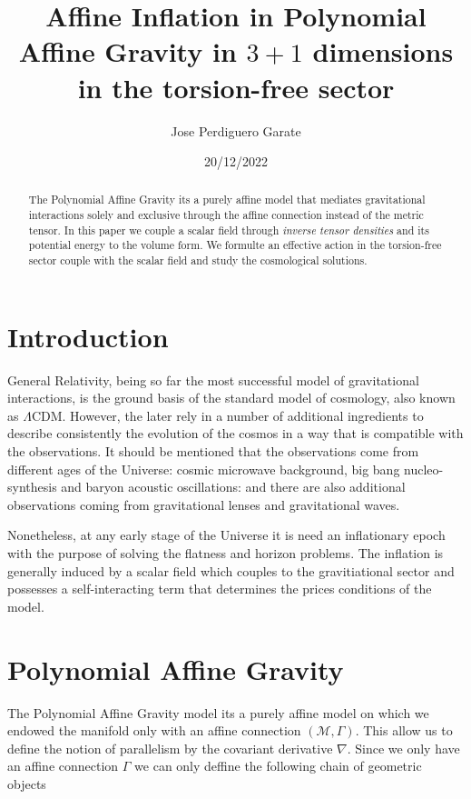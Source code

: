 \documentclass[10pt,a4paper]{article}
\title{Affine Inflation in Polynomial Affine Gravity in $3+1$ dimensions in the torsion-free sector}
\author{Jose Perdiguero Garate}
\date{20/12/2022}
\begin{document}
\maketitle

\begin{abstract}
  The Polynomial Affine Gravity its a purely affine model that mediates gravitational interactions solely and exclusive through the
  affine connection instead of the metric tensor. In this paper we couple a scalar field through \textit{inverse tensor densities} and 
  its potential energy to the volume form. We formulte an effective action in the torsion-free sector couple with the scalar field and
  study the cosmological solutions.
\end{abstract}

\tableofcontents

\section{Introduction}

General Relativity, being so far the most successful model of gravitational interactions, is the ground basis of the standard model 
of cosmology, also known as $\Lambda$CDM. However, the later rely in a number of additional ingredients to describe consistently the evolution
of the cosmos in a way that is compatible with the observations. It should be mentioned that the observations come from different ages of the Universe:
cosmic microwave background, big bang nucleo-synthesis and baryon acoustic oscillations: and there are also additional observations coming from 
gravitational lenses and gravitational waves.

Nonetheless, at any early stage of the Universe it is need an inflationary epoch with the purpose of solving the flatness and horizon problems. The
inflation is generally induced by a scalar field which couples to the gravitiational sector and possesses a self-interacting term that
determines the prices conditions of the model.

\section{Polynomial Affine Gravity}

The Polynomial Affine Gravity model its a purely affine model on which we endowed the manifold only with an affine connection 
$(\mathcal{M}, \Gamma)$. This allow us to define the notion of parallelism by the covariant derivative $\nabla$. Since we only
have an affine connection $\Gamma$ we can only deffine the following chain of geometric objects
\end{document}
